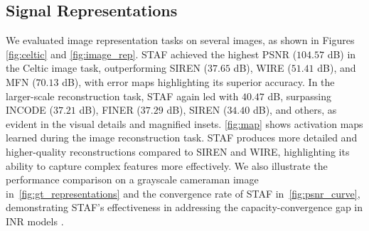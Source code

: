 \subsection{Signal Representations}
We evaluated image representation tasks on several images, as shown in Figures \ref{fig:celtic} and \cref{fig:image_rep}. STAF achieved the highest PSNR (\(104.57\) dB) in the Celtic image task, outperforming SIREN (\(37.65\) dB), WIRE (\(51.41\) dB), and MFN (\(70.13\) dB), with error maps highlighting its superior accuracy. In the larger-scale reconstruction task, STAF again led with \(40.47\) dB, surpassing INCODE (\(37.21\) dB), FINER (\(37.29\) dB), SIREN (\(34.40\) dB), and others, as evident in the visual details and magnified insets. \cref{fig:map} shows activation maps learned during the image reconstruction task. STAF produces more detailed and higher-quality reconstructions compared to SIREN and WIRE, highlighting its ability to capture complex features more effectively. We also illustrate the performance comparison on a grayscale cameraman image in~\cref{fig:gt_representations} and the convergence rate of STAF in~\cref{fig:psnr_curve}, demonstrating STAF's effectiveness in addressing the capacity-convergence gap in INR models \cite{liu2024finer}. 

